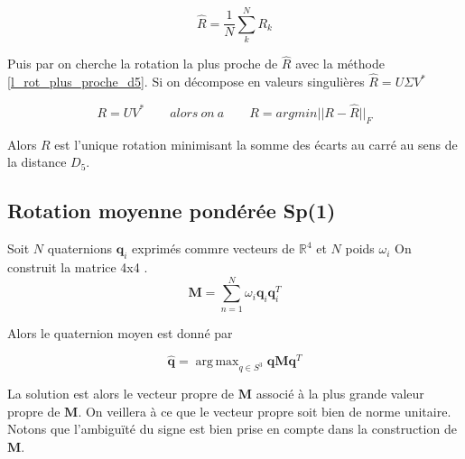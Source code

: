 \documentclass[12pt,a4paper]{article}
\DeclareMathOperator*{\argmax}{arg\,max}
\begin{document}
\[
	\hat{R}=\frac{1}{N}\sum_k^N R_k
\]

Puis par on cherche la rotation la plus proche de $\hat{R}$ avec la méthode \ref{l_rot_plus_proche_d5}. Si on décompose en valeurs singulières $\hat{R}=U \Sigma V^*$

\[
\boxed{R=UV^*}\qquad alors\ on\ a \qquad \boxed{R=argmin ||R-\hat{R}||_F}
\]

Alors $R$ est l'unique rotation minimisant la somme des écarts au carré au sens de la distance $D_5$.

\subsection{Rotation moyenne pondérée Sp(1)}

Soit $N$ quaternions $\bm{q}_i$ exprimés commre vecteurs de $\mathbb{R}^4$ et $N$ poids $\omega_i$ On construit la matrice 4x4 .\\

\[
\bm{M}=\sum_{n=1}^N \omega_i \bm{q}_i \bm{q}^T_i
\]

Alors le quaternion moyen est donné par 

\[
\bm{\hat{q}}= \argmax_{q\in S^3} \bm{q} \bm{M} \bm{q}^T
\]

La solution est alors le vecteur propre de $\bm{M}$ associé à la plus grande valeur propre de $\bm{M}$. On veillera à ce que le vecteur propre soit bien de norme unitaire. Notons que l'ambiguïté du signe est bien prise en compte dans la construction de $\bm{M}$.
\end{document}
